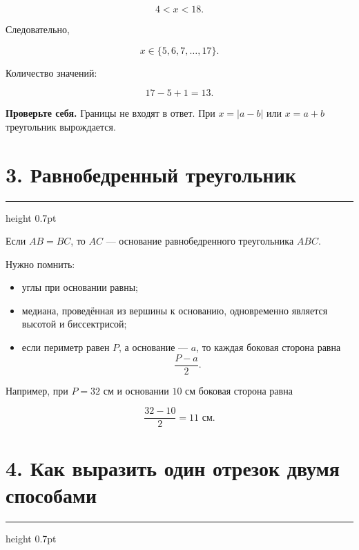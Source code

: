 \documentclass[a4paper,12pt]{article}
\newcommand{\sectionline}{%
    \vspace{-0.15em}
    {\color{accent}\hrule height 0.7pt}
    \vspace{0.55em}
}
\newcommand{\warning}[1]{%
    \par\noindent
    {\color{darkaccent}\textbf{Проверьте себя.}} #1\par
}
\begin{document}
\[
4<x<18.
\]

Следовательно,

\[
x\in\{5,6,7,\ldots,17\}.
\]

Количество значений:

\[
17-5+1=13.
\]

\begin{center}
\end{center}

\warning{Границы не входят в ответ. При $x=|a-b|$ или $x=a+b$ треугольник
вырождается.}

\section*{\color{darkaccent}3. Равнобедренный треугольник}
\sectionline

Если $AB=BC$, то $AC$ --- основание равнобедренного треугольника $ABC$.

Нужно помнить:

\begin{itemize}
    \item углы при основании равны;
    \item медиана, проведённая из вершины к основанию, одновременно является
    высотой и биссектрисой;
    \item если периметр равен $P$, а основание --- $a$, то каждая боковая
    сторона равна
    \[
        \frac{P-a}{2}.
    \]
\end{itemize}

Например, при $P=32$ см и основании $10$ см боковая сторона равна

\[
\frac{32-10}{2}=11\text{ см}.
\]

\section*{\color{darkaccent}4. Как выразить один отрезок двумя способами}
\sectionline
\end{document}
